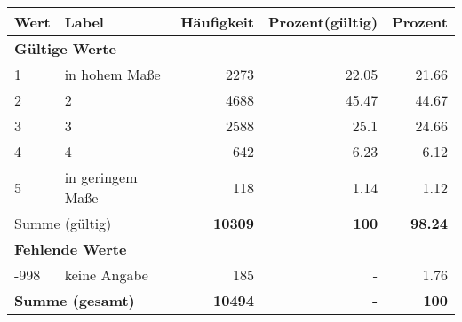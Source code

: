      \begin{longtable}{lXrrr}
     \toprule
     \textbf{Wert} & \textbf{Label} & \textbf{Häufigkeit} & \textbf{Prozent(gültig)} & \textbf{Prozent} \\
     \endhead
     \midrule
     \multicolumn{5}{l}{\textbf{Gültige Werte}}\\

     1 &
     \multicolumn{1}{X}{ in hohem Maße   } &


       \num{2273} &
       \num[round-mode=places,round-precision=2]{22,05} &
         \num[round-mode=places,round-precision=2]{21,66} \\

     2 &
     \multicolumn{1}{X}{ 2   } &


       \num{4688} &
       \num[round-mode=places,round-precision=2]{45,47} &
         \num[round-mode=places,round-precision=2]{44,67} \\

     3 &
     \multicolumn{1}{X}{ 3   } &


       \num{2588} &
       \num[round-mode=places,round-precision=2]{25,1} &
         \num[round-mode=places,round-precision=2]{24,66} \\

     4 &
     \multicolumn{1}{X}{ 4   } &


       \num{642} &
       \num[round-mode=places,round-precision=2]{6,23} &
         \num[round-mode=places,round-precision=2]{6,12} \\

     5 &
     \multicolumn{1}{X}{ in geringem Maße   } &


       \num{118} &
       \num[round-mode=places,round-precision=2]{1,14} &
         \num[round-mode=places,round-precision=2]{1,12} \\
     \midrule
     \multicolumn{2}{l}{Summe (gültig)} &
       \textbf{\num{10309}} &
     \textbf{100} &
       \textbf{\num[round-mode=places,round-precision=2]{98,24}} \\
     \multicolumn{5}{l}{\textbf{Fehlende Werte}}\\
       -998 &
       keine Angabe &
         \num{185} &
        - &
         \num[round-mode=places,round-precision=2]{1,76} \\
     \midrule
     \multicolumn{2}{l}{\textbf{Summe (gesamt)}} &
          \textbf{\num{10494}} &
        \textbf{-} &
        \textbf{100} \\
     \bottomrule
     \end{longtable}
     

